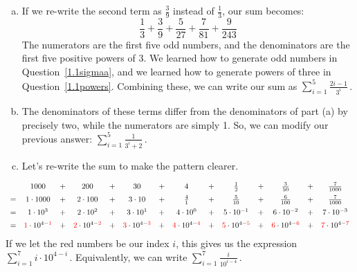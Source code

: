 \begin{solution}
\begin{enumerate}[(a)]
\item If we re-write the second term as $\frac{3}{9}$ instead of $\frac{1}{3}$, our sum becomes:
\[\frac{1}{3}+\frac{3}{9}+\frac{5}{27}+\frac{7}{81}+\frac{9}{243}\]
The numerators are the first five odd numbers, and the denominators are the first five positive powers of 3. We learned how to generate odd numbers in Question~\ref{1.1sigmaa}, and we learned how to generate powers of three in Question~\ref{1.1powers}. Combining these, we can write our sum as
$\displaystyle\sum_{i=1}^5 \frac{2i-1}{3^i}$\,.
\item The denominators of these terms differ from the denominators of part (a) by precisely two, while the numerators are simply 1. So, we can modify our previous answer: $\displaystyle\sum_{i=1}^5 \frac{1}{3^i+2}$\,.
\item Let's re-write the sum to make the pattern clearer.
\end{enumerate}
\[\begin{array}{cccccccccccccc}
&1000&+&200&+&30&+&4&+&\frac{1}{2}&+&\frac{3}{50}&+&\frac{7}{1000}\\[5pt]
=&1\cdot1000&+&2\cdot 100&+&3\cdot10&+&\frac{4}{1}&+&\frac{5}{10}&+&\frac{6}{100}&+&\frac{7}{1000}\\[5pt]
=&1\cdot 10^3 &+& 2\cdot 10^2&+&3\cdot 10^1 &+& 4\cdot 10^0 &+& 5 \cdot 10^{-1} &+&
6\cdot 10^{-2} &+& 7 \cdot 10^{-3} \\[5pt]
=&\textcolor{red}1\cdot 10^{4-\textcolor{red}1} &+& \textcolor{red}2\cdot 10^{4-\textcolor{red}2}&+&\textcolor{red}3\cdot 10^{4-\textcolor{red}3} &+& \textcolor{red}4\cdot 10^{4-\textcolor{red}4} &+& \textcolor{red}5 \cdot 10^{4-\textcolor{red}5} &+&
\textcolor{red}6\cdot 10^{4-\textcolor{red}6} &+& \textcolor{red}7 \cdot 10^{4-\textcolor{red}7}
\end{array}\]
If we let the red numbers be our index $i$, this gives us the expression $\displaystyle\sum_{i=1}^7 i\cdot10^{4-i}$\,. Equivalently, we can write $\displaystyle\sum_{i=1}^7 \frac{i}{10^{i-4}}$\,.

\end{solution}

